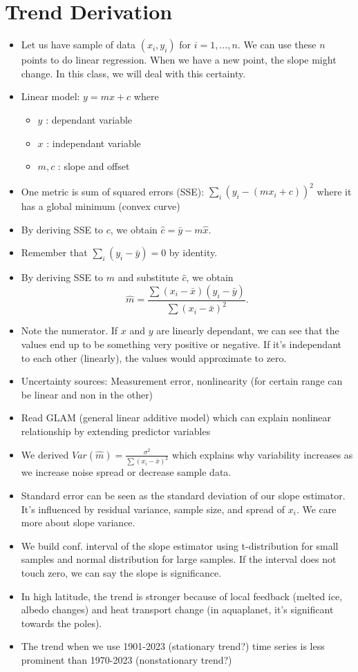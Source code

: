 \documentclass{article}
\begin{document}
\section{Trend Derivation}

\begin{itemize}
    \item Let us have sample of data $(x_i, y_i)$ for $i=1,...,n$. We can use these $n$ points to do linear regression. When we have a new point, the slope might change. In this class, we will deal with this certainty.
    \item Linear model: $y=mx+c$ where
    \begin{itemize}
        \item $y$ : dependant variable
        \item $x$ : independant variable
        \item $m,c$ : slope and offset
    \end{itemize}
    \item One metric is sum of squared errors (SSE): $\sum_i (y_i - (mx_i + c))^2$ where it has a global minimum (convex curve)
    \item By deriving SSE to $c$, we obtain $\hat{c} = \bar{y} - m\hat{x}$.
    \item Remember that $\sum_i(y_i - \bar{y}) = 0$ by identity.
    \item By deriving SSE to $m$ and substitute $\hat{c}$, we obtain
    \[ \hat{m} = \frac{\sum(x_i - \bar{x})(y_i - \bar{y})}{\sum(x_i - \bar{x})^2}. \]
    \item Note the numerator. If $x$ and $y$ are linearly dependant, we can see that the values end up to be something very positive or negative. If it's independant to each other (linearly), the values would approximate to zero.
    \item Uncertainty sources: Measurement error, nonlinearity (for certain range can be linear and non in the other)
    \item Read GLAM (general linear additive model) which can explain nonlinear relationship by extending predictor variables
    \item We derived $Var(\hat{m}) = \frac{\sigma^2}{\sum(x_i - \bar{x})^2}$ which explains why variability increases as we increase noise spread or decrease sample data.
    \item Standard error can be seen as the standard deviation of our slope estimator. It's influenced by residual variance, sample size, and spread of $x_i$. We care more about slope variance.
    \item We build conf. interval of the slope estimator using t-distribution for small samples and normal distribution for large samples. If the interval does not touch zero, we can say the slope is significance.
    \item In high latitude, the trend is stronger because of local feedback (melted ice, albedo changes) and heat transport change (in aquaplanet, it's significant towards the poles).
    \item The trend when we use 1901-2023 (stationary trend?) time series is less prominent than 1970-2023 (nonstationary trend?)
\end{itemize}
\end{document}
